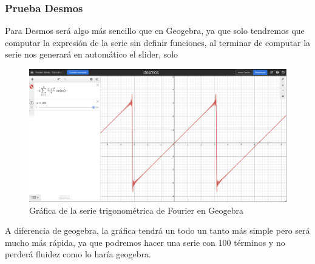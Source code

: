 \subsubsection{Prueba Desmos}
Para Desmos será algo más sencillo que en Geogebra, ya que solo tendremos que computar la expresión de la serie sin definir funciones, al terminar de computar la serie nos generará en automático el slider, solo 
\begin{figure}[H]
	\centering
	\includegraphics[width=1\textwidth]{img/chapter02/desmos-trig-series-graph.png}
	\caption{Gráfica de la serie trigonométrica de Fourier en Geogebra}
	\label{fig:desmos-trig-series}  %
\end{figure}
A diferencia de geogebra, la gráfica tendrá un todo un tanto más simple pero será mucho más rápida, ya que podremos hacer una serie con 100 términos y no perderá fluidez como lo haría geogebra.

